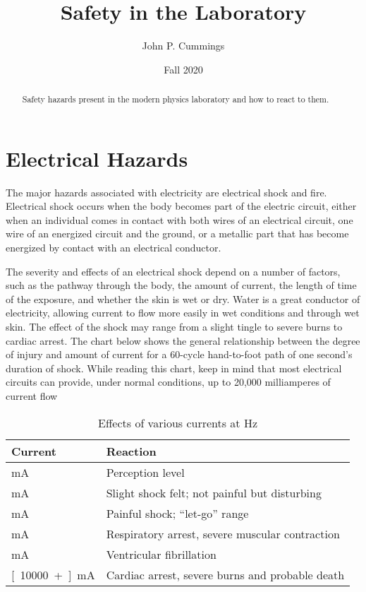 \documentclass{tufte-handout}
\title{Safety in the Laboratory}
\author[John P. Cummings]{John P. Cummings}
\date{Fall 2020}
\begin{document}
\maketitle

\begin{abstract}
\noindent Safety hazards present in the modern physics laboratory and how to react to them.
\end{abstract}



\section{Electrical Hazards}\label{sec:electrical-hazards}
The major hazards associated with electricity are electrical shock and fire. Electrical shock occurs when the body becomes part of the electric circuit, either when an individual comes in contact with both wires of an electrical circuit, one wire of an energized circuit and the ground, or a metallic part that has become energized by contact with an electrical conductor.

The severity and effects of an electrical shock depend on a number of factors, such as the pathway through the body, the amount of current, the length of time of the exposure, and whether the skin is wet or dry. Water is a great conductor of electricity, allowing current to flow more easily in wet conditions and through wet skin. The effect of the shock may range from a slight tingle to severe burns to cardiac arrest. The chart below shows the general relationship between the degree of injury and amount of current for a 60-cycle hand-to-foot path of one second's duration of shock. While reading this chart, keep in mind that most electrical circuits can provide, under normal conditions, up to 20,000 milliamperes of current flow 
\begin{table}[ht]
  \centering
  \selectfont
  \begin{tabular}{ll}
    \toprule
    Current & Reaction \\
    \midrule
    \unit[1]{mA} & Perception level \\
    \unit[5]{mA} & Slight shock felt; not painful but disturbing \\
    \unit[6-30]{mA} & Painful shock; ``let-go'' range \\
    \unit[50-150]{mA} & Respiratory arrest, severe muscular contraction \\
    \unit[1000-4300]{mA} & Ventricular fibrillation\\
    \unit[10000+]{mA} & Cardiac arrest, severe burns and probable death \\
    \bottomrule
  \end{tabular}
  \caption{Effects of various currents at \unit[60]{Hz} }
  \label{tab:normaltab}
\end{table}
\end{document}

